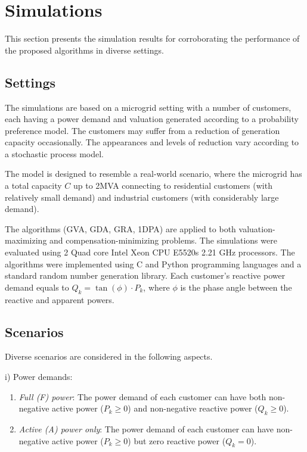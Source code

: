 \vspace{-5pt} 
\section{Simulations}\label{sec:sims}

This section presents the simulation results for corroborating the performance of the proposed algorithms in diverse settings.

\vspace{-5pt} 
\subsection{Settings}

The simulations are based on a microgrid setting with a number of customers, each having a power demand and valuation generated according to a probability preference model. The customers may suffer from a reduction of generation capacity occasionally. The appearances and levels of reduction vary according to a stochastic process model.  

The model is designed to resemble  a real-world scenario, where the microgrid has a total capacity $C$ up to 2MVA connecting to residential customers (with relatively small demand) and industrial customers (with considerably large demand).

The algorithms ({\sc GVA}, {\sc GDA}, {\sc GRA}, {\sc 1DPA}) are applied to both valuation-maximizing and compensation-minimizing problems. 
The simulations were evaluated using 2 Quad core Intel Xeon CPU E5520s 2.21 GHz processors. The algorithms were implemented using C and Python programming languages and a standard random number generation library.
Each customer's reactive power demand equals to $ Q_k = \tan (\phi) \cdot P_k $, where $\phi$ is the phase angle between the reactive and apparent powers. %

\vspace{-5pt} 
\subsection{Scenarios}

Diverse scenarios are considered in the following aspects.

\noindent
i) Power demands:
\begin{enumerate}

\item {\em Full (F) power}: The power demand of each customer can have both non-negative active power ($P_k \ge 0$) and non-negative reactive power ($Q_k \ge 0$).

\item {\em Active (A) power only}: The power demand of each customer can have non-negative active power ($P_k \ge 0$) but zero reactive power ($Q_k = 0$).

\end{enumerate}

